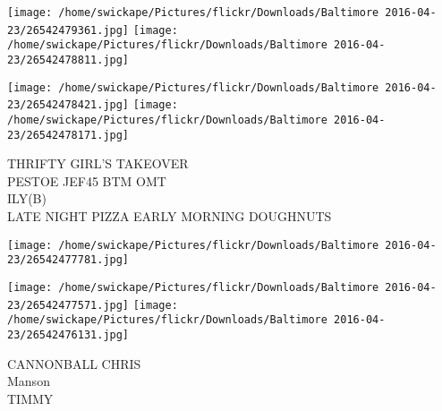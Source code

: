 \documentclass[10pt,letterpaper]{article}
\begin{document}
\texttt{[image: /home/swickape/Pictures/flickr/Downloads/Baltimore 2016-04-23/26542479361.jpg]}
\texttt{[image: /home/swickape/Pictures/flickr/Downloads/Baltimore 2016-04-23/26542478811.jpg]}

\texttt{[image: /home/swickape/Pictures/flickr/Downloads/Baltimore 2016-04-23/26542478421.jpg]}
\texttt{[image: /home/swickape/Pictures/flickr/Downloads/Baltimore 2016-04-23/26542478171.jpg]}

THRIFTY GIRL'S TAKEOVER\\
PESTOE JEF45 BTM OMT\\
ILY(B)\\
LATE NIGHT PIZZA EARLY MORNING DOUGHNUTS\\
\pagebreak

\texttt{[image: /home/swickape/Pictures/flickr/Downloads/Baltimore 2016-04-23/26542477781.jpg]}

\vspace{0.25in}
\texttt{[image: /home/swickape/Pictures/flickr/Downloads/Baltimore 2016-04-23/26542477571.jpg]}
\texttt{[image: /home/swickape/Pictures/flickr/Downloads/Baltimore 2016-04-23/26542476131.jpg]}

CANNONBALL CHRIS\\
Manson\\
TIMMY\\
\pagebreak
\end{document}
